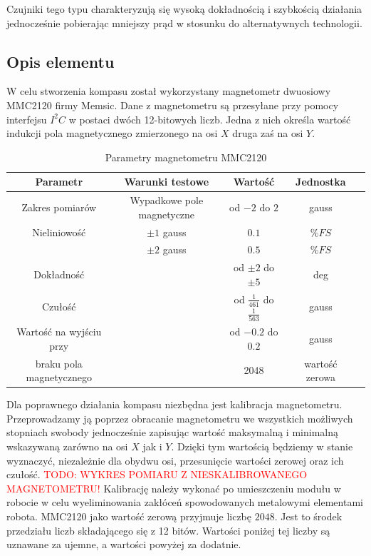 Czujniki tego typu charakteryzują się wysoką dokładnością i szybkością działania jednocześnie pobierając mniejszy prąd w stosunku do alternatywnych technologii.

\subsection{Opis elementu}
W celu stworzenia kompasu został wykorzystany magnetometr dwuosiowy MMC2120 firmy Memsic. Dane z magnetometru są przesyłane przy pomocy interfejsu $I^{2}C$ w postaci dwóch 12-bitowych liczb. Jedna z nich określa wartość indukcji pola magnetycznego zmierzonego na osi $X$ druga zaś na osi $Y$. 
\\

\begin{table}[hb]
\centering
\caption{Parametry magnetometru MMC2120}
   	\begin{tabular}{ | c | c | c | c | p{1.75cm} |} \hline
   		Parametr & Warunki testowe & Wartość & Jednostka \\ \hline
   		Zakres pomiarów & Wypadkowe pole magnetyczne & od $-2$ do $2$ & gauss\\ \hline
   		Nieliniowość & $\pm 1$ gauss & $0.1$ & $\% FS$ \\
   		& $\pm 2$ gauss & $0.5$ & $\% FS$ \\ \hline
   		Dokładność & & od $\pm 2$ do $\pm 5$ & deg \\ \hline
   		Czułość & & od $\frac{1}{461}$ do $\frac{1}{563}$ & gauss \\ \hline
   		Wartość na wyjściu przy & & od $-0.2$ do $0.2$ & gauss \\
   		braku pola magnetycznego & & 2048 & wartość zerowa \\ \hline
   	\end{tabular}
\label{tab:MMC2120Char}
\end{table}

Dla poprawnego działania kompasu niezbędna jest kalibracja magnetometru. Przeprowadzamy ją poprzez obracanie magnetometru we wszystkich możliwych stopniach swobody jednocześnie zapisując wartość maksymalną i minimalną wskazywaną zarówno na osi $X$ jak i $Y$. Dzięki tym wartością będziemy w stanie wyznaczyć, niezależnie dla obydwu osi, przesunięcie wartości zerowej oraz ich czułość.
\textcolor{red}{TODO: WYKRES POMIARU Z NIESKALIBROWANEGO MAGNETOMETRU!}
Kalibrację należy wykonać po umieszczeniu modułu w robocie w celu wyeliminowania zakłóceń spowodowanych metalowymi elementami robota. MMC2120 jako wartość zerową przyjmuje liczbę $2048$. Jest to środek przedziału liczb składającego się z 12 bitów. Wartości poniżej tej liczby są uznawane za ujemne, a wartości powyżej za dodatnie.

